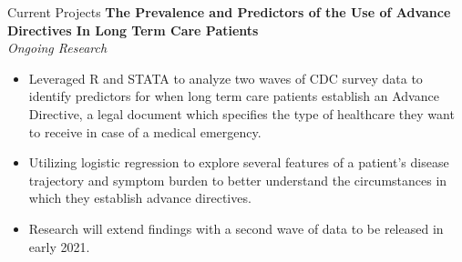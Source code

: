 \documentclass{resume}
\begin{document}
\begin{rSection}{Current Projects}
\noindent \textbf{The Prevalence and Predictors of the Use of Advance Directives In Long Term Care
Patients} \\
\textit{Ongoing Research} %
\begin{itemize}[noitemsep,nolistsep,leftmargin=*]
\item {Leveraged R and STATA to analyze two waves of CDC survey data to identify predictors for when long term care patients establish an Advance Directive, a legal document which specifies the type of healthcare they want to receive in case of a medical emergency.}
\item {Utilizing logistic regression to explore several features of a patient's disease trajectory and symptom burden to better understand the circumstances in which they establish advance directives.}
\item {Research will extend findings with a second wave of data to be released in early 2021. \\}
\end{itemize}

\end{rSection}
\end{document}
